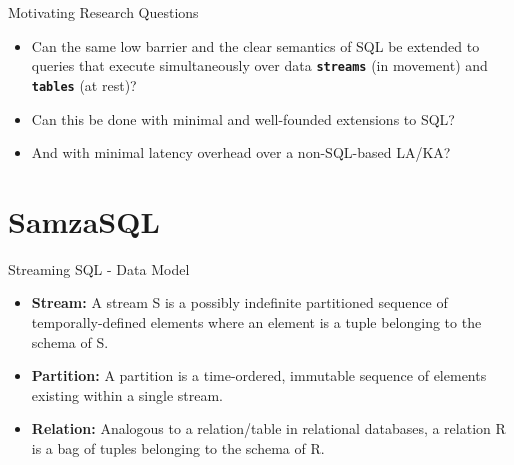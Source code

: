 \documentclass[newPxFont]{beamer}
\begin{document}
\begin{frame}{Motivating Research Questions}
\begin{itemize}
\item Can the same low barrier and the clear semantics of SQL be extended to queries that execute simultaneously over data \texttt{\textbf{streams}} (in movement) and \texttt{\textbf{tables}} (at rest)?

\item Can this be done with minimal and well-founded extensions to SQL?

\item And with minimal latency overhead over a non-SQL-based LA/KA?
\end{itemize}
\end{frame}

%
%

\section{SamzaSQL}


\begin{frame}[c]{Streaming SQL - Data Model}

\begin{itemize}
    \item \textbf{Stream:} A stream S is a possibly indefinite partitioned sequence of temporally-defined elements where an element is a tuple belonging to the schema of S.
	\item \textbf{Partition:} A partition is a time-ordered, immutable sequence of elements existing within a single stream.
	\item \textbf{Relation:} Analogous to a relation/table in relational databases, a relation R is a bag of tuples belonging to the schema of R. 
\end{itemize}

\end{frame}


\end{document}
